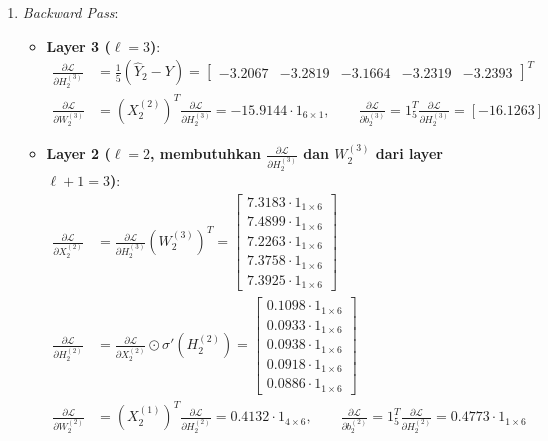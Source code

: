 \documentclass[11pt,a4paper]{article}
\def\mathbf#1{#1}%
\theoremstyle{plain}
\theoremstyle{definition}
\theoremstyle{remark}
\begin{document}
\begin{enumerate}
    \item \textit{Backward Pass}:
    \begin{itemize}
        \item \textbf{Layer 3 ($\ell = 3$)}:
        \begin{align}
            \frac{\partial \mathcal{L}}{\partial H^{(3)}_2} &= \frac{1}{5}\left(\hat{Y}_2 - Y\right) = \begin{bmatrix} -3.2067 & -3.2819 & -3.1664 & -3.2319 & -3.2393 \end{bmatrix}^T \\[0.2em]
            \frac{\partial \mathcal{L}}{\partial W^{(3)}_2} &= \left( X^{(2)}_2 \right)^T \frac{\partial \mathcal{L}}{\partial H^{(3)}_2} = -15.9144 \cdot \mathbf{1}_{6 \times 1}, \qquad \frac{\partial \mathcal{L}}{\partial \mathbf{b}^{(3)}_2} = \mathbf{1}_5^T \frac{\partial \mathcal{L}}{\partial H^{(3)}_2} = [-16.1263]
        \end{align}
        \item \textbf{Layer 2 ($\ell = 2$, membutuhkan $\frac{\partial \mathcal{L}}{\partial H^{(3)}_2}$ dan $W^{(3)}_2$ dari layer $\ell+1 = 3$)}:
        \begin{align}
            \frac{\partial \mathcal{L}}{\partial X^{(2)}_2} &= \frac{\partial \mathcal{L}}{\partial H^{(3)}_2} \left( W^{(3)}_2 \right)^T = \begin{bmatrix} 7.3183 \cdot \mathbf{1}_{1 \times 6} \\ 7.4899 \cdot \mathbf{1}_{1 \times 6} \\ 7.2263 \cdot \mathbf{1}_{1 \times 6} \\ 7.3758 \cdot \mathbf{1}_{1 \times 6} \\ 7.3925 \cdot \mathbf{1}_{1 \times 6} \end{bmatrix} \\[0.2em]
            \frac{\partial \mathcal{L}}{\partial H^{(2)}_2} &= \frac{\partial \mathcal{L}}{\partial X^{(2)}_2} \odot \sigma'\!\left(H^{(2)}_2\right) = \begin{bmatrix} 0.1098 \cdot \mathbf{1}_{1 \times 6} \\ 0.0933 \cdot \mathbf{1}_{1 \times 6} \\ 0.0938 \cdot \mathbf{1}_{1 \times 6} \\ 0.0918 \cdot \mathbf{1}_{1 \times 6} \\ 0.0886 \cdot \mathbf{1}_{1 \times 6} \end{bmatrix} \\[0.2em]
            \frac{\partial \mathcal{L}}{\partial W^{(2)}_2} &= \left( X^{(1)}_2 \right)^T \frac{\partial \mathcal{L}}{\partial H^{(2)}_2} = 0.4132 \cdot \mathbf{1}_{4 \times 6}, \qquad \frac{\partial \mathcal{L}}{\partial \mathbf{b}^{(2)}_2} = \mathbf{1}_5^T \frac{\partial \mathcal{L}}{\partial H^{(2)}_2} = 0.4773 \cdot \mathbf{1}_{1 \times 6}

\end{align}
\end{itemize}
\end{enumerate}
\end{document}
